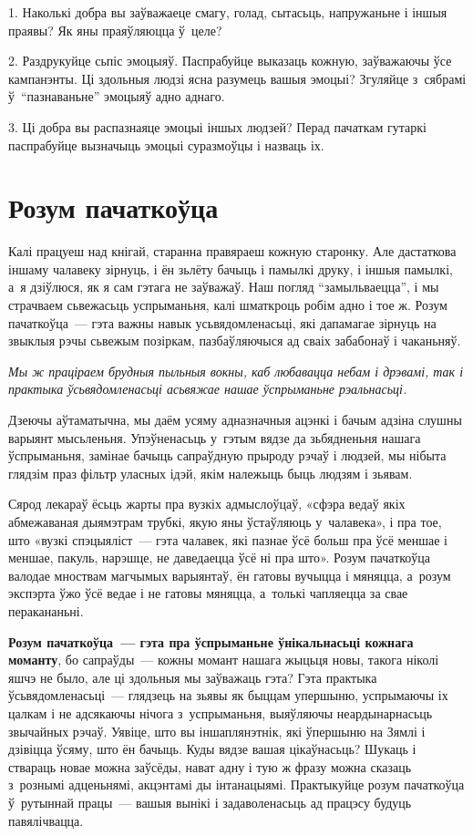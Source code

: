 1. Наколькі добра вы заўважаеце смагу, голад, сытасьць, напружаньне і іншыя праявы? Як яны праяўляюцца ў~целе?

2. Раздрукуйце сьпіс эмоцыяў. Паспрабуйце выказаць кожную, заўважаючы ўсе кампанэнты. Ці здольныя людзі ясна разумець вашыя эмоцыі? Згуляйце з~сябрамі ў~``пазнаваньне'' эмоцыяў адно аднаго.

3. Ці добра вы распазнаяце эмоцыі іншых людзей? Перад пачаткам гутаркі паспрабуйце вызначыць эмоцыі суразмоўцы і назваць іх.


\section{Розум пачаткоўца}

Калі працуеш над кнігай, старанна правяраеш кожную старонку. Але дастаткова іншаму чалавеку зірнуць, і ён зьлёту бачыць і памылкі друку, і іншыя памылкі, а~я дзіўлюся, як я сам гэтага не заўважаў. Наш погляд ``замыльваецца'', і мы страчваем сьвежасьць успрыманьня, калі шматкроць робім адно і тое ж. Розум пачаткоўца~--- гэта важны навык усьвядомленасьці, які дапамагае зірнуць на звыклыя рэчы сьвежым позіркам, пазбаўляючыся ад сваіх забабонаў і чаканьняў.

\emph{Мы ж праціраем брудныя пыльныя вокны, каб любавацца небам і дрэвамі, так і практыка ўсьвядомленасьці асьвяжае нашае ўспрыманьне рэальнасьці.}

Дзеючы аўтаматычна, мы даём усяму адназначныя ацэнкі і бачым адзіна слушны варыянт мысьленьня. Упэўненасьць у~гэтым вядзе да зьбядненьня нашага ўспрыманьня, замінае бачыць сапраўдную прыроду рэчаў і людзей, мы нібыта глядзім праз фільтр уласных ідэй, якім належыць быць людзям і зьявам.

Сярод лекараў ёсьць жарты пра вузкіх адмыслоўцаў, «сфэра ведаў якіх абмежаваная дыямэтрам трубкі, якую яны ўстаўляюць у~чалавека», і пра тое, што «вузкі спэцыяліст~--- гэта чалавек, які пазнае ўсё больш пра ўсё меншае і меншае, пакуль, нарэшце, не даведаецца ўсё ні пра што». Розум пачаткоўца валодае мноствам магчымых варыянтаў, ён гатовы вучыцца і мяняцца, а~розум экспэрта ўжо ўсё ведае і не гатовы мяняцца, а~толькі чапляецца за свае перакананьні.

\textbf{Розум пачаткоўца~--- гэта пра ўспрыманьне ўнікальнасьці кожнага моманту}, бо сапраўды~--- кожны момант нашага жыцьця новы, такога ніколі яшчэ не было, але ці здольныя мы заўважаць гэта? Гэта практыка ўсьвядомленасьці~--- глядзець на зьявы як быццам упершыню, успрымаючы іх цалкам і не адсякаючы нічога з~успрыманьня, выяўляючы неардынарнасьць звычайных рэчаў. Уявіце, што вы іншаплянэтнік, які ўпершыню на Зямлі і дзівіцца ўсяму, што ён бачыць. Куды вядзе вашая цікаўнасьць? Шукаць і ствараць новае можна заўсёды, нават адну і тую ж фразу можна сказаць з~рознымі адценьнямі, акцэнтамі ды інтанацыямі. Практыкуйце розум пачаткоўца ў~рутыннай працы~--- вашыя вынікі і задаволенасьць ад працэсу будуць павялічвацца. 

